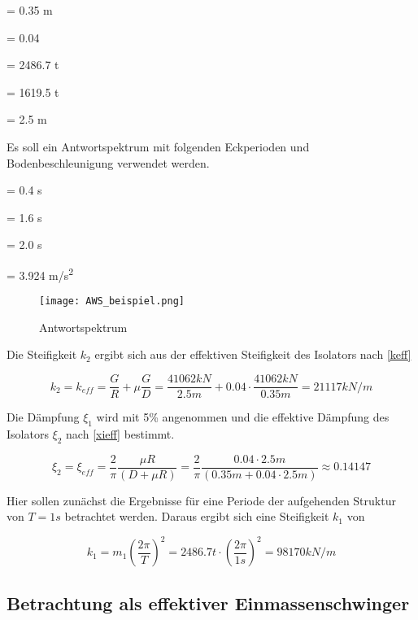     = 0.35 m \par
\makebox[1cm]{$\mu$}  = 0.04\par
{}  = 2486.7 t\par
{}  = 1619.5 t\par
{}    = 2.5 m\par

Es soll ein Antwortspektrum mit folgenden Eckperioden und Bodenbeschleunigung verwendet werden.

  = 0.4 s\par
{}  = 1.6 s\par
{}  = 2.0 s\par
{}  = 3.924 m/s\textsuperscript{2}\par

\begin{figure}[H]
    \centering
    \texttt{[image: AWS\_beispiel.png]}
    \caption{Antwortspektrum}
\end{figure}

Die Steifigkeit $k_2$ ergibt sich aus der effektiven Steifigkeit des Isolators nach \cref{keff}

\begin{equation*}
k_2 = k_{eff} = \frac{G}{R} + \mu \frac{G}{D} = \frac{41062 kN}{2.5 m} + 0.04 \cdot \frac{41062 kN}{0.35 m} = 21117 kN/m
\end{equation*}

Die Dämpfung $\xi_1$ wird mit 5\% angenommen und die effektive Dämpfung des Isolators $\xi_2$ nach \cref{xieff} bestimmt.

\begin{equation*}
\xi_2 = \xi_{eff} = \frac{2}{\pi} \frac{\mu R}{(D + \mu R)} = \frac{2}{\pi} \frac{0.04 \cdot 2.5 m}{(0.35 m + 0.04 \cdot 2.5 m)} \approx 0.14147
\end{equation*}

Hier sollen zunächst die Ergebnisse für eine Periode der aufgehenden Struktur von $T = 1 s$ betrachtet werden. Daraus ergibt sich eine Steifigkeit $k_1$ von

\begin{equation*}
k_1 = m_1 (\frac{2 \pi}{T})^2 = 2486.7 t \cdot (\frac{2 \pi}{1 s})^2 = 98170 kN/m
\end{equation*}

\subsection{Betrachtung als effektiver Einmassenschwinger}

